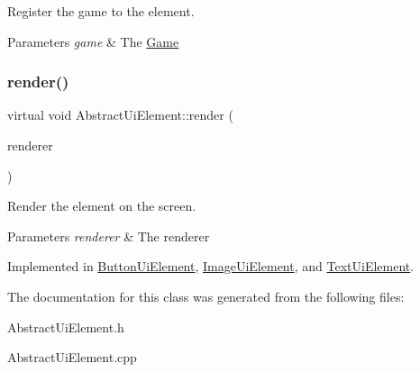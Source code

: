Register the game to the element. 


\begin{DoxyParams}{Parameters}
{\em game} & The \mbox{\hyperlink{class_game}{Game}}\\
\hline
\end{DoxyParams}
\mbox{\label{class_abstract_ui_element_afacedc89a5805d95d3bdcf20619b1c06}} 
\subsubsection{\texorpdfstring{render()}{render()}}
{\footnotesize\ttfamily virtual void Abstract\+Ui\+Element\+::render (\begin{DoxyParamCaption}\item[{S\+D\+L\+\_\+\+Renderer $\ast$}]{renderer }\end{DoxyParamCaption})\hspace{0.3cm}{\ttfamily [pure virtual]}}



Render the element on the screen. 


\begin{DoxyParams}{Parameters}
{\em renderer} & The renderer\\
\hline
\end{DoxyParams}


Implemented in \mbox{\hyperlink{class_button_ui_element_ad319e20e8abedefe07aef58a38ae9a81}{Button\+Ui\+Element}}, \mbox{\hyperlink{class_image_ui_element_a422fc1d3b4c1451f656e7470e575577b}{Image\+Ui\+Element}}, and \mbox{\hyperlink{class_text_ui_element_a7931ba283acdf102442a9181b3ddf276}{Text\+Ui\+Element}}.



The documentation for this class was generated from the following files\+:\begin{DoxyCompactItemize}
\item 
Abstract\+Ui\+Element.\+h\item 
Abstract\+Ui\+Element.\+cpp\end{DoxyCompactItemize}
